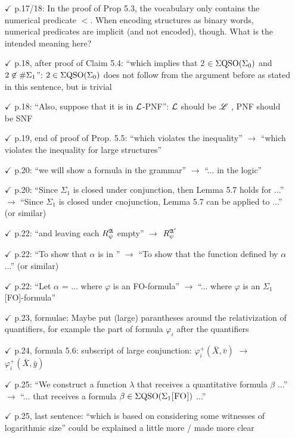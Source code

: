 \documentclass[a4paper]{article}
\begin{document}
\begin{itemize}
\item[$\checkmark$] p.17/18: In the proof of Prop 5.3, the vocabulary only contains the numerical predicate $<$. When encoding structures as binary words, numerical predicates are implicit (and not
encoded), though. What is the intended meaning here?
\item[$\checkmark$] p.18, after proof of Claim 5.4: ``which implies that 2 $\in \Sigma{\rm QSO}(\Sigma_0)$ and $2 \not\in \#\Sigma_{1}$'': $2 \in \Sigma{\rm QSO}(\Sigma_0)$
does not follow from the argument before as stated in this sentence, but is trivial
\item[$\checkmark$] p.18: ``Also, suppose that it is in $\mathcal{L}$-PNF'': $\mathcal{L}$ should be $\mathscr{L}$ , PNF should be SNF
\item[$\checkmark$] p.19, end of proof of Prop. 5.5: ``which violates the inequality'' $\to$ ``which violates the inequality
for large structures''
\item[$\checkmark$] p.20: ``we will show a formula in the grammar'' $\to$ ``... in the logic''
\item[$\checkmark$] p.20: ``Since $\Sigma_1$ is closed under conjunction, then Lemma 5.7 holds for ...'' $\to$ ``Since $\Sigma_1$ is
closed under cnojunction, Lemma 5.7 can be applied to ...'' (or similar)
\item[$\checkmark$] p.22: ``and leaving each $R_{\psi}^{\mathfrak{A}}$ empty'' $\to$ $R_{\psi}^{\mathfrak{A}'}$
\item[$\checkmark$] p.22: ``To show that $\alpha$ is in \totp'' $\to$ ``To show that the function defined by $\alpha$ ...'' (or similar)
\item[$\checkmark$] p.22: ``Let $\alpha$ = ... where $\varphi$ is an FO-formula'' $\to$ ``... where $\varphi$ is an $\Sigma_1$[FO]-formula''
\item[$\checkmark$] p.23, formulae: Maybe put (large) parantheses around the relativization of quantifiers, for
example the part of formula $\varphi_i$ after the quantifiers
\item[$\checkmark$] p.24, formula 5.6: subscript of large conjunction: $\varphi_i^{+}(\bar{X},\bar{v})$ $\to$ $\varphi_i^{+}(\bar{X},\bar{y})$
\item[$\checkmark$] p.25: ``We construct a function $\lambda$ that receives a quantitative formula $\beta$ ...'' $\to$ ``... that receives
a formula $\beta \in \Sigma{\rm QSO}(\Sigma_{1}\textsc{[FO]})$ ...''
\item[$\checkmark$] p.25, last sentence: ``which is based on considering some witnesses of logarithmic size'' could
be explained a little more / made more clear


\end{itemize}
\end{document}

